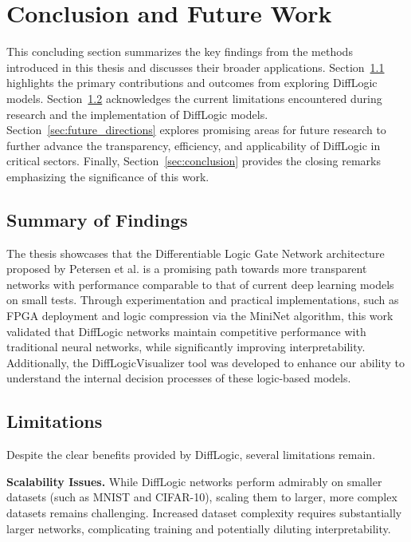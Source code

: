 \chapter{Conclusion and Future Work}
\label{chap:conclusion}

This concluding section summarizes the key findings from the methods introduced in this thesis and discusses their broader applications. Section~\ref{sec:summary_findings} highlights the primary contributions and outcomes from exploring DiffLogic models. Section~\ref{sec:limitations} acknowledges the current limitations encountered during research and the implementation of DiffLogic models. Section~\ref{sec:future_directions} explores promising areas for future research to further advance the transparency, efficiency, and applicability of DiffLogic in critical sectors. Finally, Section~\ref{sec:conclusion} provides the closing remarks emphasizing the significance of this work. 


\section{Summary of Findings}
\label{sec:summary_findings}

The thesis showcases that the Differentiable Logic Gate Network architecture proposed by Petersen et al. is a promising path towards more transparent networks with performance comparable to that of current deep learning models on small tests. Through experimentation and practical implementations, such as FPGA deployment and logic compression via the MiniNet algorithm, this work validated that DiffLogic networks maintain competitive performance with traditional neural networks, while significantly improving interpretability. Additionally, the DiffLogicVisualizer tool was developed to enhance our ability to understand the internal decision processes of these logic-based models.

\section{Limitations}
\label{sec:limitations}

Despite the clear benefits provided by DiffLogic, several limitations remain.

\textbf{Scalability Issues.} While DiffLogic networks perform admirably on smaller datasets (such as MNIST and CIFAR-10), scaling them to larger, more complex datasets remains challenging. Increased dataset complexity requires substantially larger networks, complicating training and potentially diluting interpretability.

